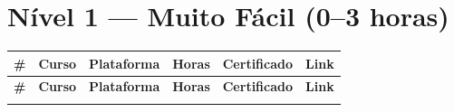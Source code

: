 \documentclass[11pt,a4paper]{article}
\begin{document}
\clearpage
\section*{Nível 1 --- Muito Fácil (0--3 horas)}

\footnotesize
\begin{longtable}{@{}p{0.5cm}p{4.6cm}p{2.6cm}p{1.8cm}p{2.2cm}p{2.0cm}@{}}
\rowcolor{gray!10}
\textbf{\#} & \textbf{Curso} & \textbf{Plataforma} & \textbf{Horas} & \textbf{Certificado} & \textbf{Link} \\
\midrule
\endfirsthead
\rowcolor{gray!10}
\textbf{\#} & \textbf{Curso} & \textbf{Plataforma} & \textbf{Horas} & \textbf{Certificado} & \textbf{Link} \\
\midrule
\endhead
\bottomrule
\endfoot
\bottomrule
\endlastfoot


\end{longtable}
\end{document}
